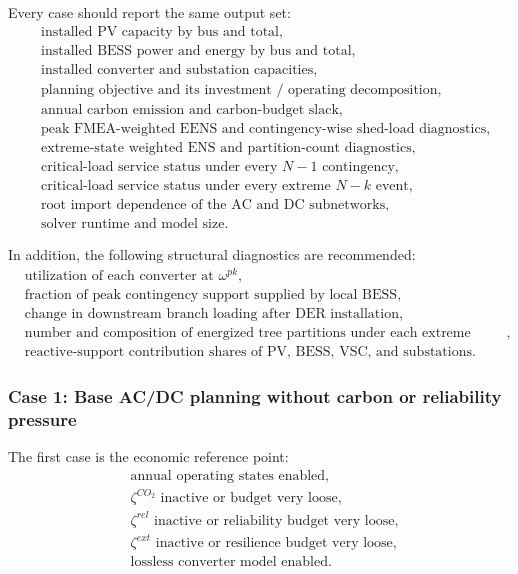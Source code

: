 Every case should report the same output set:
\begin{align}
&\text{installed PV capacity by bus and total}, \\
&\text{installed BESS power and energy by bus and total}, \\
&\text{installed converter and substation capacities}, \\
&\text{planning objective and its investment / operating decomposition}, \\
&\text{annual carbon emission and carbon-budget slack}, \\
&\text{peak FMEA-weighted EENS and contingency-wise shed-load diagnostics}, \\
&\text{extreme-state weighted ENS and partition-count diagnostics}, \\
&\text{critical-load service status under every } N{-}1 \text{ contingency}, \\
&\text{critical-load service status under every extreme } N{-}k \text{ event}, \\
&\text{root import dependence of the AC and DC subnetworks}, \\
&\text{solver runtime and model size}. 
\end{align}

In addition, the following structural diagnostics are recommended:
\begin{align}
&\text{utilization of each converter at } \omega^{pk}, \\
&\text{fraction of peak contingency support supplied by local BESS}, \\
&\text{change in downstream branch loading after DER installation}, \\
&\text{number and composition of energized tree partitions under each extreme event}, \\
&\text{reactive-support contribution shares of PV, BESS, VSC, and substations}. 
\end{align}

\subsubsection{Case 1: Base AC/DC planning without carbon or reliability pressure}

The first case is the economic reference point:
\begin{align}
&\text{annual operating states enabled}, \\
&\zeta^{CO_2} \text{ inactive or budget very loose}, \\
&\zeta^{rel} \text{ inactive or reliability budget very loose}, \\
&\zeta^{ext} \text{ inactive or resilience budget very loose}, \\
&\text{lossless converter model enabled}. 
\end{align}

